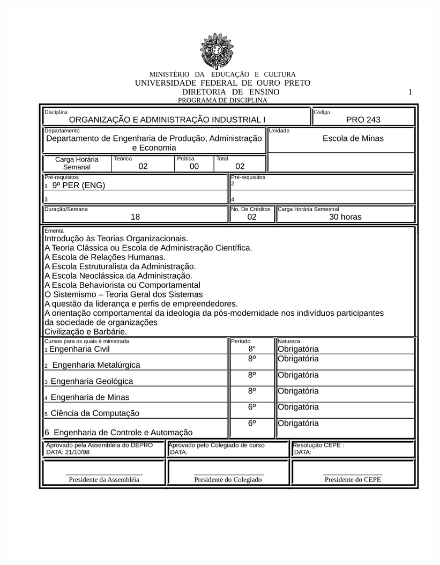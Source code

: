 \begin{figure}[p]
	\centering 
	\includegraphics[scale=0.7]{capitulos/anexo1-programas-disciplina/p96.pdf}
\end{figure}

